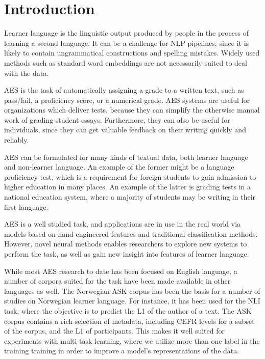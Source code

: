 \chapter{Introduction}

\acresetall

Learner language is the linguistic output produced by people in the process
of learning a second language. It can be a challenge for \ac{NLP} pipelines,
since it is likely to contain ungrammatical constructions and spelling
mistakes. Widely used methods such as standard word embeddings are not
necessarily suited to deal with the data. 

\ac{AES} is the task of automatically assigning a grade to a written text,
such as pass/fail, a proficiency score, or a numerical grade. \ac{AES}
systems are useful for organizations which deliver tests, because they can
simplify the otherwise manual work of grading student essays. Furthermore,
they can also be useful for individuals, since they can get valuable feedback
on their writing quickly and reliably.

\ac{AES} can be formulated for many kinds of textual data, both learner
language and non-learner language. An example of the former might be a
language proficiency test, which is a requirement for foreign students to
gain admission to higher education in many places. An example of the latter
is grading tests in a national education system, where a majority of students
may be writing in their first language.

\ac{AES} is a well studied task, and applications are in use in the real
world via models based on hand-engineered features and traditional
classification methods. However, novel neural methods enables researchers to
explore new systems to perform the task, as well as gain new insight into
features of learner language.

While most \ac{AES} research to date has been focused on English language, a
number of corpora suited for the task have been made available in other
languages as well. The Norwegian ASK corpus has been the basis for a number
of studies on Norwegian learner language. For instance, it has been used for
the \ac{NLI} task, where the objective is to predict the \ac{L1} of the
author of a text. The ASK corpus contains a rich selection of metadata,
including CEFR levels for a subset of the corpus, and the \ac{L1} of
participants. This makes it well suited for experiments with multi-task
learning, where we utilize more than one label in the training training in
order to improve a model's representations of the data.

